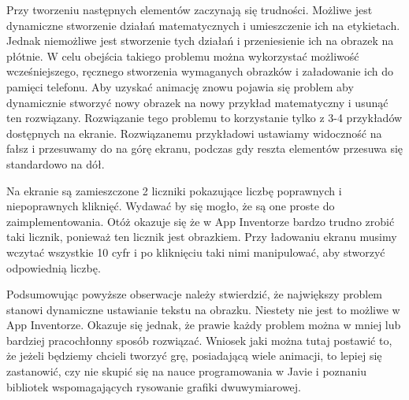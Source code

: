 Przy tworzeniu następnych elementów zaczynają się trudności. Możliwe jest dynamiczne stworzenie działań matematycznych i umieszczenie ich na etykietach. Jednak niemożliwe jest stworzenie tych działań i przeniesienie ich na obrazek na płótnie. W celu obejścia takiego problemu można wykorzystać możliwość wcześniejszego, ręcznego stworzenia wymaganych obrazków i załadowanie ich do pamięci telefonu. Aby uzyskać animację znowu pojawia się problem aby dynamicznie stworzyć nowy obrazek na nowy przykład matematyczny i usunąć ten rozwiązany. Rozwiązanie tego problemu to korzystanie tylko z 3-4 przykładów dostępnych na ekranie. Rozwiązanemu przykładowi ustawiamy widoczność na fałsz i przesuwamy do na górę ekranu, podczas gdy reszta elementów przesuwa się standardowo na dół.

Na ekranie są zamieszczone 2 liczniki pokazujące liczbę poprawnych i niepoprawnych kliknięć. Wydawać by się mogło, że są one proste do zaimplementowania. Otóż okazuje się że w App Inventorze bardzo trudno zrobić taki licznik, ponieważ ten licznik jest obrazkiem. Przy ładowaniu ekranu musimy wczytać wszystkie 10 cyfr i po kliknięciu taki nimi manipulować, aby stworzyć odpowiednią liczbę.

Podsumowując powyższe obserwacje należy stwierdzić, że największy problem stanowi dynamiczne ustawianie tekstu na obrazku. Niestety nie jest to możliwe w App Inventorze. Okazuje się jednak, że prawie każdy problem można w mniej lub bardziej pracochłonny sposób rozwiązać. Wniosek jaki można tutaj postawić to, że jeżeli będziemy chcieli tworzyć grę, posiadającą wiele animacji, to lepiej się zastanowić, czy nie skupić się na nauce programowania w Javie i poznaniu bibliotek wspomagających rysowanie grafiki dwuwymiarowej.

